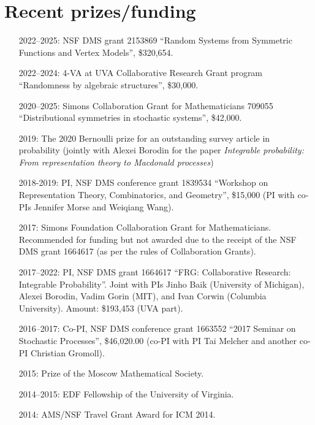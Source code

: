 \documentclass[letterpaper,11pt]{article}
\begin{document}
\section*{Recent prizes/funding}
\begin{itemize}
	\item [2022--2025:]
	NSF DMS grant 2153869
	``Random Systems from Symmetric Functions and Vertex Models'',
	\$320,654.

	\item [2022--2024:]
	4-VA at UVA Collaborative Research Grant program
	``Randomness by algebraic structures'',
	\$30,000.
	\item [2020--2025:]
		Simons Collaboration Grant for Mathematicians 709055
		``Distributional symmetries in stochastic systems'',
		\$42,000.
	\item [2019:]
		The 2020 Bernoulli prize for an outstanding survey article in probability
		(jointly with Alexei Borodin for the paper \emph{Integrable probability: From representation theory to
		Macdonald processes})
	\item
				[2018-2019:]
				PI, NSF DMS conference grant
				1839534
				``Workshop on Representation Theory, Combinatorics, and Geometry'',
				\$15,000
				(PI with co-PIs Jennifer Morse and Weiqiang Wang).
	\item
	      [2017:] Simons Foundation Collaboration Grant for
	      Mathematicians. Recommended for funding but not awarded due to
	      the receipt of the NSF DMS grant 1664617 (as per the rules of Collaboration
	      Grants).
	\item
	      [2017--2022:] PI, NSF DMS grant 1664617
	      ``FRG: Collaborative Research: Integrable Probability''.
	      Joint with PIs Jinho Baik (University of Michigan), Alexei
	      Borodin, Vadim Gorin (MIT), and Ivan Corwin (Columbia University). Amount:
	      \$193,453 (UVA part).
	\item
	      [2016--2017:]
	      Co-PI, NSF DMS conference grant 1663552 ``2017 Seminar on Stochastic
	      Processes'', \$46,020.00 (co-PI with PI Tai Melcher and another co-PI
	      Christian Gromoll).
	\item
	      [2015:] Prize of the Moscow Mathematical Society.
	\item
	      [2014--2015:] EDF Fellowship of the University of Virginia.
	\item
	      [2014:] AMS/NSF Travel Grant Award for ICM 2014.

\end{itemize}
\end{document}

